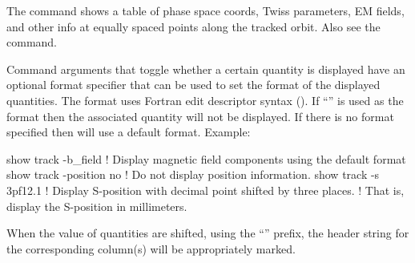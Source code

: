{{{{{{{{{The  command shows a table of phase space coords, Twiss parameters, EM fields, and
other info at equally spaced points along the tracked orbit. Also see the 
command.

Command arguments that toggle whether a certain quantity is displayed have an optional 
format specifier that can be used to set the format of the displayed quantities. The format uses
Fortran edit descriptor syntax (). If ``'' is used as the format then
the associated quantity will not be displayed. If there is no format specified then \tao will use
a default format. Example:
\begin{example}
  show track -b_field      ! Display magnetic field components using the default format
  show track -position no  ! Do not display position information.
  show track -s 3pf12.1    ! Display S-position with decimal point shifted by three places.
                           !   That is, display the S-position in millimeters.
\end{example}
When the value of quantities are shifted, using the ``'' prefix, the header string for the
corresponding column(s) will be appropriately marked.

}}}}}}}}}
